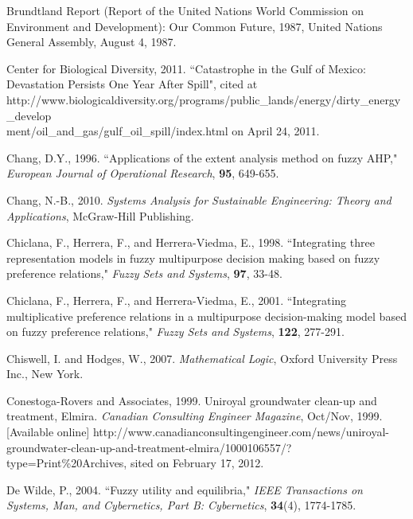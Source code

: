 \documentclass[letterpaper,12pt,titlepage,oneside,final]{book}
\begin{document}
\begin{thebibliography}{}
Brundtland Report (Report of the United Nations World Commission on Environment and Development): Our Common Future, 1987, United Nations General Assembly, August 4, 1987.

Center for Biological Diversity, 2011. ``Catastrophe in the Gulf of Mexico: Devastation Persists One Year After Spill", cited at http://www.biologicaldiversity.org/programs/public\_lands/energy/dirty\_energy\_develop
\\ment/oil\_and\_gas/gulf\_oil\_spill/index.html on April 24, 2011.

Chang, D.Y., 1996. ``Applications of the extent analysis method on fuzzy AHP," \emph{European Journal of Operational Research}, {\bf 95}, 649-655.

Chang, N.-B., 2010. \emph{Systems Analysis for Sustainable Engineering: Theory and Applications}, McGraw-Hill Publishing.

Chiclana, F., Herrera, F., and Herrera-Viedma, E., 1998. ``Integrating three representation models in fuzzy multipurpose decision making based on fuzzy preference relations," \emph{Fuzzy Sets and Systems}, {\bf 97}, 33-48.

Chiclana, F., Herrera, F., and Herrera-Viedma, E., 2001. ``Integrating multiplicative preference relations in a multipurpose decision-making model based on fuzzy preference relations," \emph{Fuzzy Sets and Systems}, {\bf 122}, 277-291.

Chiswell, I. and Hodges, W., 2007. \emph{Mathematical Logic}, Oxford University Press Inc., New York.

Conestoga-Rovers and Associates, 1999. Uniroyal groundwater clean-up and treatment, Elmira. \emph{Canadian Consulting Engineer Magazine}, Oct/Nov, 1999. [Available online] http://www.canadianconsultingengineer.com/news/uniroyal-groundwater-clean-up-and-treatment-elmira/1000106557/?type=Print\%20Archives, sited on February 17, 2012.

De Wilde, P., 2004. ``Fuzzy utility and equilibria," \emph{IEEE Transactions on Systems, Man, and Cybernetics, Part B: Cybernetics}, {\bf 34}(4), 1774-1785.


\end{thebibliography}
\end{document}
